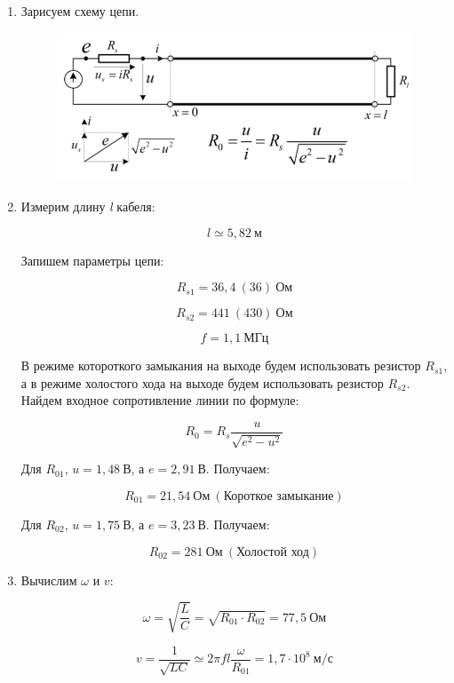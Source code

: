 \documentclass[a4paper, 12pt]{article}%
\begin{document}
\begin{enumerate}

\item Зарисуем схему цепи.

\begin{figure}[h!]
\centering
\includegraphics[scale=1]{images/Scheme1.png}
\label{fig:Image1}
\end{figure}

\item Измерим длину \textit{l} кабеля:

\[l \simeq 5,82 \: \textit{м}\]

Запишем параметры цепи:

\[R_{s1} = 36,4 \: (36) \: \textit{Ом}\]

\[R_{s2} = 441 \: (430) \: \textit{Ом}\]

\[f = 1,1 \: \textit{МГц}\]

В режиме котороткого замыкания на выходе будем использовать резистор $R_{s1}$, а в режиме холостого хода на выходе будем использовать резистор $R_{s2}$. Найдем входное сопротивление линии по формуле:

\[R_0 = R_s \frac{u}{\sqrt{e^2 - u^2}}\]

Для $R_{01}$, $u = 1,48 \: \textit{В}$, а $e = 2,91 \: \textit{В}$. Получаем:

\[R_{01} = 21,54 \: \textit{Ом} \: (\text{Короткое замыкание})\]

Для $R_{02}$, $u = 1,75 \: \textit{В}$, а $e = 3,23 \: \textit{В}$. Получаем:

\[R_{02} = 281 \: \textit{Ом} \: (\text{Холостой ход})\]

\item Вычислим $\omega$ и $v$:

\[\omega = \sqrt{\frac{L}{C}} = \sqrt{R_{01}\cdot R_{02}} = 77,5 \: \textit{Ом}\]

\[v = \frac{1}{\sqrt{LC}} \simeq 2 \pi f l \frac{\omega}{R_{01}} = 1,7 \cdot 10^8 \: \textit{м/с}\]


\end{enumerate}
\end{document}
